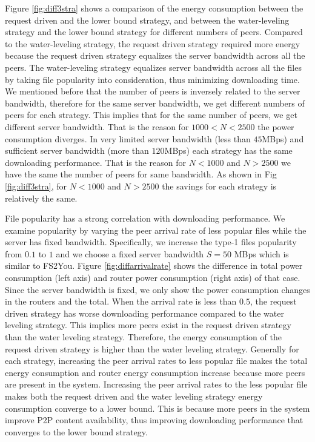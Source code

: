 Figure \ref{fig:diff3stra} shows a comparison of the energy consumption between the request driven and the lower bound strategy, and between the water-leveling strategy and the lower bound strategy for different numbers of peers. 
Compared to the water-leveling strategy, the request driven strategy required more energy because the request driven strategy equalizes the server bandwidth across all the peers. 
The water-leveling strategy equalizes server bandwidth across all the files by taking file popularity into consideration, thus minimizing downloading time. 
We mentioned before that the number of peers is inversely related to the server bandwidth, therefore for the same server bandwidth, we get different numbers of peers for each strategy.  
This implies that for the same number of peers, we get different server bandwidth. 
That is the reason for $1000<N<2500$ the power consumption diverges. 
In very limited server bandwidth (less than $45$MBps) and sufficient server bandwidth (more than $120$MBps) each strategy has the same downloading performance. 
That is the reason for $N<1000$ and $N>2500$ we have the same the number of peers for same bandwidth. 
As shown in Fig \ref{fig:diff3stra}, for $N<1000$ and $N>2500$ the savings for each strategy is relatively the same.

File popularity has a strong correlation with downloading performance. 
We examine popularity by varying the peer arrival rate of less popular files while the server has fixed bandwidth. 
Specifically, we increase the type-1 files popularity from $0.1$ to $1$ and we choose a fixed server bandwidth $S=50$ MBps which is similar to FS2You. 
Figure \ref{fig:diffarrivalrate} shows the difference in total power consumption (left axis) and router power consumption (right axis) of that case.  
Since the server bandwidth is fixed, we only show the power consumption changes in the routers and the total. 
When the arrival rate is less than $0.5$, the request driven strategy has worse downloading performance compared to the water leveling strategy. 
This implies more peers exist in the request driven strategy than the water leveling strategy. 
Therefore, the energy consumption of the request driven strategy is higher than the water leveling strategy. 
Generally for each strategy, increasing the peer arrival rates to less popular file makes the total energy consumption and router energy consumption increase because more peers are present in the system.
Increasing the peer arrival rates to the less popular file makes both the request driven and the water leveling strategy energy consumption converge to a lower bound.
This is because more peers in the system improve P2P content availability, thus improving downloading performance that converges to the lower bound strategy.


